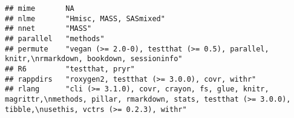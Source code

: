 \documentclass[
]{article}
\begin{document}
\begin{verbatim}
## mime       NA                                                                                                                                                                                                                                                                                                                                                 
## nlme       "Hmisc, MASS, SASmixed"                                                                                                                                                                                                                                                                                                                            
## nnet       "MASS"                                                                                                                                                                                                                                                                                                                                             
## parallel   "methods"                                                                                                                                                                                                                                                                                                                                          
## permute    "vegan (>= 2.0-0), testthat (>= 0.5), parallel, knitr,\nrmarkdown, bookdown, sessioninfo"                                                                                                                                                                                                                                                          
## R6         "testthat, pryr"                                                                                                                                                                                                                                                                                                                                   
## rappdirs   "roxygen2, testthat (>= 3.0.0), covr, withr"                                                                                                                                                                                                                                                                                                       
## rlang      "cli (>= 3.1.0), covr, crayon, fs, glue, knitr, magrittr,\nmethods, pillar, rmarkdown, stats, testthat (>= 3.0.0), tibble,\nusethis, vctrs (>= 0.2.3), withr"                                                                                                                                                                                      

\end{verbatim}
\end{document}
